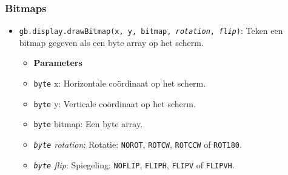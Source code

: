 \documentclass[a4paper,titlepage,12pt]{article}
\begin{document}
	\subsubsection{Bitmaps}
	\begin{itemize}
		\item \texttt{gb.display.drawBitmap(x, y, bitmap, \textit{rotation}, \textit{flip})}: Teken een bitmap gegeven als een byte array op het scherm.
		\begin{itemize}
			\item [] \textbf{Parameters}
			\item \texttt{byte} x: Horizontale coördinaat op het scherm.
			\item \texttt{byte} y: Verticale coördinaat op het scherm.
			\item \texttt{byte} bitmap: Een byte array.
			\item \textit{\texttt{byte} rotation}: Rotatie: \texttt{NOROT}, \texttt{ROTCW}, \texttt{ROTCCW} of \texttt{ROT180}.
			\item \textit{\texttt{byte} flip}: Spiegeling: \texttt{NOFLIP}, \texttt{FLIPH}, \texttt{FLIPV} of \texttt{FLIPVH}.
		\end{itemize}
	\end{itemize}
\end{document}
